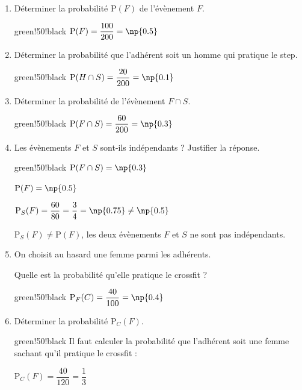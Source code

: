 	\begin{enumerate}
		\item Déterminer la probabilité $\text{P}(F)$ de l'évènement $F$.
		
		\begin{color}{green!50!black}
		$\text{P}(F)=\dfrac{100}{200}=\np{0.5}$
		\end{color}
		
		\item Déterminer la probabilité que l'adhérent soit un homme qui pratique le step.
		
		\begin{color}{green!50!black}
		$\text{P}(H\cap S)=\dfrac{20}{200}=\np{0.1}$
		\end{color}
		
		\item Déterminer la probabilité de l'évènement $F\cap S$.
		
		\begin{color}{green!50!black}
		$\text{P}(F\cap S)=\dfrac{60}{200}=\np{0.3}$
		\end{color}
		
		\item Les évènements $F$ et $S$ sont-ils indépendants ? Justifier la réponse.
		
		\begin{color}{green!50!black}
		$\text{P}(F\cap S)=\np{0.3}$
		
		$\text{P}(F)=\np{0.5}$
		
		$\text{P}_{S}(F)=\dfrac{60}{80} = \dfrac{3}{4} = \np{0.75} \neq \np{0.5}$
		
		$\text{P}_{S}(F)\neq \text{P}(F)$, les deux évènements $F$ et $S$ ne sont pas indépendants.
		\end{color}
		
		\item On choisit au hasard une femme parmi les adhérents.
		
		Quelle est la probabilité qu'elle pratique le crossfit ?
		
		
		\begin{color}{green!50!black}
		$\text{P}_{F}(C)=\dfrac{40}{100} = \np{0.4}$
	
		\end{color}
		\item Déterminer la probabilité $\text{P}_{C}(F)$.

		\begin{color}{green!50!black}
		 Il faut calculer la probabilité que l'adhérent soit une femme sachant qu'il pratique le crossfit :
		 
		$\text{P}_{C}(F)=\dfrac{40}{120} = \dfrac{1}{3}$
	
		\end{color}

	\end{enumerate}
